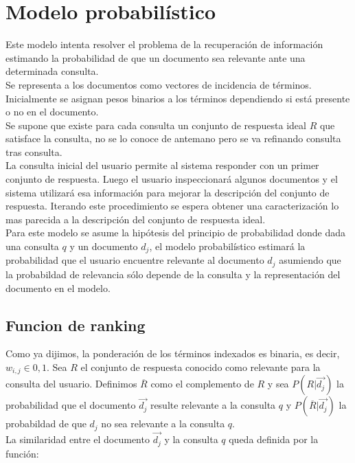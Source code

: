 \section{Modelo probabilístico}

Este modelo intenta resolver el problema de la recuperación de información estimando la probabilidad de que un documento sea relevante ante una determinada consulta.\\
Se representa a los documentos como vectores de incidencia de términos. Inicialmente se asignan pesos binarios a los términos dependiendo si está presente o no en el documento.\\
Se supone que existe para cada consulta un conjunto de respuesta ideal $R$ que satisface la consulta, no se lo conoce de antemano pero se va refinando consulta tras consulta.\\
La consulta inicial del usuario permite al sistema responder con un primer conjunto de respuesta. Luego el usuario inspeccionará algunos documentos y el sistema utilizará esa información para mejorar la descripción del conjunto de respuesta. Iterando este procedimiento se espera obtener una caracterización lo mas parecida a la descripción del conjunto de respuesta ideal.\\
Para este modelo se asume la hipótesis del principio de probabilidad donde dada una consulta $q$ y un documento $d_{j}$, el modelo probabilístico estimará la probabilidad que el usuario encuentre relevante al documento $d_{j}$ asumiendo que la probabildad de relevancia sólo depende de la consulta y la representación del documento en el modelo.\\

\subsection{Funcion de ranking}

Como ya dijimos, la ponderación de los términos indexados es binaria, es decir, $w_{i,j} \in {0,1}$.
Sea $R$ el conjunto de respuesta conocido como relevante para la consulta del usuario. Definimos $\overline{R}$ como el complemento de $R$ y sea $P(R|\overrightarrow{d_{j}})$ la probabilidad que el documento $\overrightarrow{d_{j}}$ resulte relevante a la consulta $q$ y $P(\overline{R}|\overrightarrow{d_{j}})$ la probabildad de que $d_{j}$ no sea relevante a la consulta $q$.\\
La similaridad entre el documento $\overrightarrow{d_{j}}$ y la consulta $q$ queda definida por la función:

